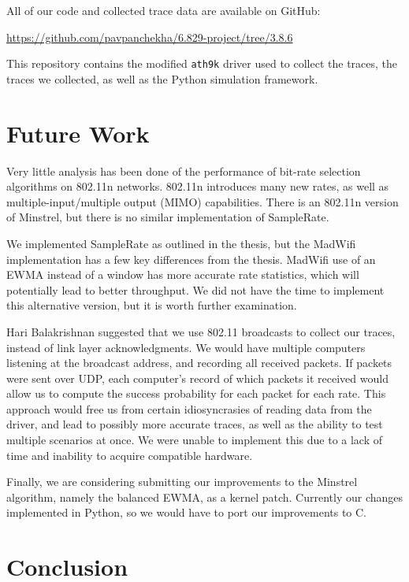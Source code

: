 \documentclass[twocolumn,10pt]{article}
\begin{document}
All of our code and collected trace data are available on GitHub:

\noindent
{\small\url{https://github.com/pavpanchekha/6.829-project/tree/3.8.6}}

This repository contains the modified \texttt{ath9k} driver used to
collect the traces, the traces we collected, as well as the Python
simulation framework.

\section{Future Work}

Very little analysis has been done of the performance of bit-rate
selection algorithms on 802.11n networks.  802.11n introduces many new
rates, as well as multiple-input/multiple output (MIMO) capabilities.
There is an 802.11n version of Minstrel, but there is no similar
implementation of SampleRate.

We implemented SampleRate as outlined in the thesis, but the MadWifi
implementation has a few key differences from the thesis.  MadWifi use
of an EWMA instead of a window has more accurate rate statistics,
which will potentially lead to better throughput.  We did not have the
time to implement this alternative version, but it is worth further
examination.

Hari Balakrishnan suggested that we use 802.11 broadcasts to collect
our traces, instead of link layer acknowledgments.  We would have
multiple computers listening at the broadcast address, and recording
all received packets.  If packets were sent over UDP, each computer's
record of which packets it received would allow us to compute the
success probability for each packet for each rate.  This approach
would free us from certain idiosyncrasies of reading data from the
driver, and lead to possibly more accurate traces, as well as the
ability to test multiple scenarios at once.  We were unable to
implement this due to a lack of time and inability to acquire
compatible hardware.

Finally, we are considering submitting our improvements to the
Minstrel algorithm, namely the balanced EWMA, as a kernel patch.
Currently our changes implemented in Python, so we would have to port
our improvements to C.

\section{Conclusion}
\end{document}
